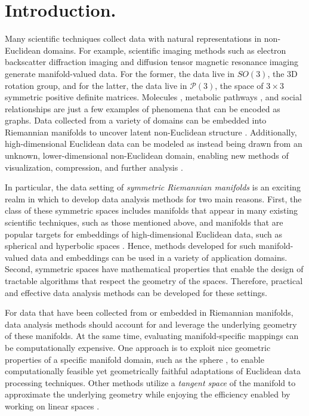 \section{Introduction.}
\label{sec:introduction}
Many scientific techniques collect data with natural representations in non-Euclidean domains. For example, scientific imaging methods such as electron backscatter diffraction imaging \citep{adams1993orientation} and diffusion tensor magnetic resonance imaging \citep{basser1994mr} generate manifold-valued data. For the former, the data live in $SO(3)$, the 3D rotation group, and for the latter, the data live in $\mathcal{P}(3)$, the space of $3 \times 3$ symmetric positive definite matrices. Molecules \citep{kearnes2016molecular}, metabolic pathways \citep{jeong2000large}, and social relationships \citep{newman2002random} are just a few examples of phenomena that can be encoded as graphs. Data collected from a variety of domains can be embedded into Riemannian manifolds to uncover latent non-Euclidean structure \citep{wilson2014spherical}. Additionally, high-dimensional Euclidean data can be modeled as instead being drawn from an unknown, lower-dimensional non-Euclidean domain, enabling new methods of visualization, compression, and further analysis \citep{bronstein2017geometric,puchkin2022structure}. 

In particular, the data setting of \emph{symmetric Riemannian manifolds} is an exciting realm in which to develop data analysis methods for two main reasons. First, the class of these symmetric spaces includes manifolds that appear in many existing scientific techniques, such as those mentioned above,  and manifolds that are popular targets for embeddings of high-dimensional Euclidean data, such as spherical and hyperbolic spaces \citep{lopez2021symmetric,keller2020hydra,wilson2014spherical}. Hence, methods developed for such manifold-valued data and embeddings can be used in a variety of application domains. Second, symmetric spaces have mathematical properties that enable the design of tractable algorithms that respect the geometry of the spaces. Therefore, practical and effective data analysis methods can be developed for these settings. 

For data that have been collected from or embedded in Riemannian manifolds, data analysis methods should account for and leverage the underlying geometry of these manifolds. At the same time, evaluating manifold-specific mappings can be computationally expensive. One approach is to exploit nice geometric properties of a specific manifold domain, such as the sphere \citep{li1999multiscale, narcowich1996nonstationary,tabaghi2023principal}, to enable computationally feasible yet geometrically faithful adaptations of Euclidean data processing techniques. Other methods utilize a \emph{tangent space} of the manifold to approximate the underlying geometry while enjoying the efficiency enabled by working on linear spaces \citep{fletcher2004principal,fletcher2004principal2,ho2013nonlinear,yin2015nonlinear}. 

